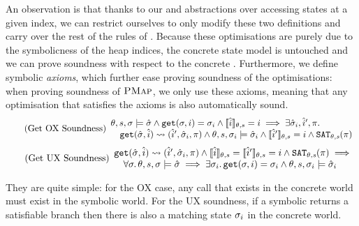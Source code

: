An observation is that thanks to our  and  abstractions over accessing states at a given index, we can restrict ourselves to only modify these two definitions and carry over the rest of the rules of \PMap. Because these optimisations are purely due to the symbolicness of the heap indices, the concrete state model is untouched and we can prove soundness with respect to the concrete \PMap. Furthermore, we define symbolic  \emph{axioms}, which further ease proving soundness of the optimisations: when proving soundness of $\textsc{PMap}$, we only use these axioms, meaning that any optimisation that satisfies the axioms is also automatically sound.
\begin{equation}
\tag{Get OX Soundness}\label{eq:get-ox-sound}
\begin{array}{l}
\theta,s,\sigma \models \hat{\sigma} \land \texttt{get}(\sigma, i)=\sigma_i \land \llbracket\hat{i}\rrbracket_{\theta,s}=i \implies \exists \hat{\sigma}_i, \hat{i}', \pi \ldotp \\
\quad \texttt{get}(\hat{\sigma},\hat{i})\rightsquigarrow(\hat{i}', \hat{\sigma}_i, \pi) \land \theta,s,\sigma_i\models\hat{\sigma}_i \land \llbracket\hat{i}'\rrbracket_{\theta,s}=i \land \texttt{SAT}_{\mathit{\theta,s}}(\pi)
\end{array}
\end{equation}
\begin{equation}
\tag{Get UX Soundness}\label{eq:get-ux-sound}
\begin{array}{l}
\texttt{get}(\hat{\sigma},\hat{i})\rightsquigarrow(\hat{i}', \hat{\sigma}_i, \pi) \land \llbracket\hat{i}\rrbracket_{\theta,s}=\llbracket\hat{i}'\rrbracket_{\theta,s}=i \land \texttt{SAT}_{\mathit{\theta,s}}(\pi) \implies \\
\quad \forall \sigma\ldotp \theta,s,\sigma \models \hat{\sigma} \implies \exists \sigma_i \ldotp \texttt{get}(\sigma, i)=\sigma_i \land \theta,s,\sigma_i \models \hat{\sigma}_i
\end{array}
\end{equation}

They are quite simple: for the OX case, any  call that exists in the concrete world must exist in the symbolic world. For the UX soundness, if a symbolic  returns a satisfiable branch then there is also a matching state $\sigma_i$ in the concrete world.

